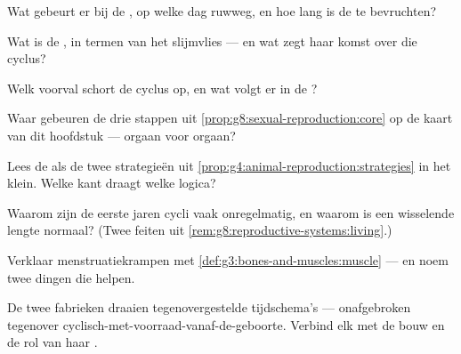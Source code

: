 \begin{exercise}[$\star$]\label{exo:g8:reproductive-systems:4}
Wat gebeurt er bij de , op welke dag ruwweg, en hoe lang is de
 te bevruchten?
\end{exercise}

\begin{exercise}[$\star$]\label{exo:g8:reproductive-systems:5}
Wat is de , in termen van het slijmvlies --- en wat zegt haar
komst over die cyclus?
\end{exercise}

\begin{exercise}[$\star$]\label{exo:g8:reproductive-systems:6}
Welk voorval schort de cyclus op, en wat volgt er in de ?
\end{exercise}

\begin{exercise}[$\star\star$]\label{exo:g8:reproductive-systems:7}
Waar gebeuren de drie stappen uit
\cref{prop:g8:sexual-reproduction:core} op de kaart van dit hoofdstuk ---
orgaan voor orgaan?
\end{exercise}

\begin{exercise}[$\star\star$]\label{exo:g8:reproductive-systems:8}
Lees de  als de twee strategieën uit
\cref{prop:g4:animal-reproduction:strategies} in het klein. Welke kant
draagt welke logica?
\end{exercise}

\begin{exercise}[$\star\star$]\label{exo:g8:reproductive-systems:9}
Waarom zijn de eerste jaren cycli vaak onregelmatig, en waarom is een
wisselende lengte normaal? (Twee feiten uit
\cref{rem:g8:reproductive-systems:living}.)
\end{exercise}

\begin{exercise}[$\star\star$]\label{exo:g8:reproductive-systems:10}
Verklaar menstruatiekrampen met
\cref{def:g3:bones-and-muscles:muscle} --- en noem twee dingen die helpen.
\end{exercise}

\begin{exercise}[$\star\star$]\label{exo:g8:reproductive-systems:11}
De twee fabrieken draaien tegenovergestelde tijdschema's ---
onafgebroken tegenover cyclisch-met-voorraad-vanaf-de-geboorte. Verbind
elk met de bouw en de rol van haar .
\end{exercise}

